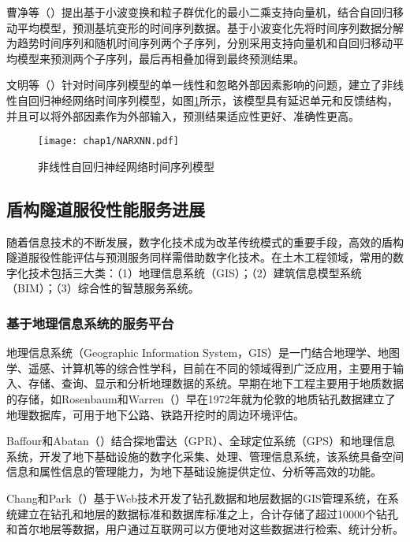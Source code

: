 曹净等（\citeyear{曹净2014基于}）提出基于小波变换和粒子群优化的最小二乘支持向量机，结合自回归移动平均模型，预测基坑变形的时间序列数据。基于小波变化先将时间序列数据分解为趋势时间序列和随机时间序列两个子序列，分别采用支持向量机和自回归移动平均模型来预测两个子序列，最后再相叠加得到最终预测结果。

文明等（\citeyear{文明2015地铁车站施工过程中地表沉降的}）针对时间序列模型的单一线性和忽略外部因素影响的问题，建立了非线性自回归神经网络时间序列模型，如图\ref{fig:非线性自回归神经网络}所示，该模型具有延迟单元和反馈结构，并且可以将外部因素作为外部输入，预测结果适应性更好、准确性更高。

\begin{figure}[!h]
	\centering
	\texttt{[image: chap1/NARXNN.pdf]}
	\caption{非线性自回归神经网络时间序列模型}
	\label{fig:非线性自回归神经网络}
\end{figure}

\subsection{盾构隧道服役性能服务进展}
\label{chap:service-intro}

随着信息技术的不断发展，数字化技术成为改革传统模式的重要手段，高效的盾构隧道服役性能评估与预测服务同样需借助数字化技术。在土木工程领域，常用的数字化技术包括三大类：（1）地理信息系统（GIS）；（2）建筑信息模型系统（BIM）；（3）综合性的智慧服务系统。

\subsubsection{基于地理信息系统的服务平台}

地理信息系统（Geographic Information System，GIS）是一门结合地理学、地图学、遥感、计算机等的综合性学科，目前在不同的领域得到广泛应用，主要用于输入、存储、查询、显示和分析地理数据的系统。早期在地下工程主要用于地质数据的存储，如Rosenbaum和Warren（\citeyear{rosenbaum1986creating}）早在1972年就为伦敦的地质钻孔数据建立了地理数据库，可用于地下公路、铁路开挖时的周边环境评估。

Baffour和Abatan（\citeyear{baffour2002developing}）结合探地雷达（GPR）、全球定位系统（GPS）和地理信息系统，开发了地下基础设施的数字化采集、处理、管理信息系统，该系统具备空间信息和属性信息的管理能力，为地下基础设施提供定位、分析等高效的功能。

Chang和Park（\citeyear{chang2004development}）基于Web技术开发了钻孔数据和地层数据的GIS管理系统，在系统建立在钻孔和地层的数据标准和数据库标准之上，合计存储了超过10000个钻孔和首尔地层等数据，用户通过互联网可以方便地对这些数据进行检索、统计分析。

